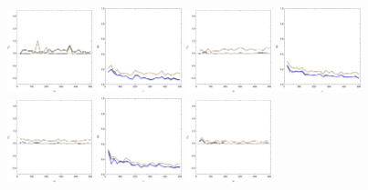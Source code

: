 \documentclass[
twoside,
openright,
titlepage,
numbers=noenddot,
headinclude,%
footinclude=true,
dottedtoc, %
ngerman,
american, %
pagesize=pdftex,
]{book}
\begin{document}
\begin{example}
\begin{figure}[H]
			\includegraphics[width=0.22\textwidth]{figures/2DTVexamples/t2}
			\includegraphics[width=0.22\textwidth]{figures/2DTVexamples/l1}
			\includegraphics[width=0.22\textwidth]{figures/2DTVexamples/l2}
			\includegraphics[width=0.22\textwidth]{figures/2DTVexamples/sn1}
			\includegraphics[width=0.22\textwidth]{figures/2DTVexamples/sn2}
			\includegraphics[width=0.22\textwidth]{figures/2DTVexamples/n+l1}
			\includegraphics[width=0.22\textwidth]{figures/2DTVexamples/n+l2}

\end{figure}
\end{example}
\end{document}
